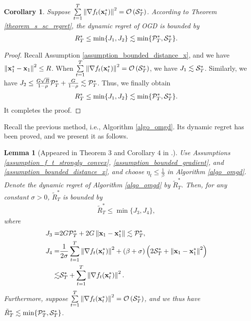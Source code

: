 \documentclass[journal]{IEEEtran}
\newtheorem{Lemma}{\bf{Lemma}}
\newtheorem{Corollary}{\bf{Corollary}}
\begin{document}
\begin{Corollary}
Suppose $\sum\limits_{t=1}^{T} \left\lVert\nabla f_t({\bf x}_t^{\ast})\right\rVert^2 = {\mathcal{O}} \left( {\mathcal{S}}_T^{\ast} \right) $. According to Theorem \ref{theorem_s_sc_regret}, the dynamic regret of OGD is bounded by 
\begin{align}
\nonumber
R_T^{\ast} \le \min \{J_1, J_2\} \lesssim \min \{{\mathcal{P}}_T^{\ast}, {\mathcal{S}}_T^{\ast} \}.
\end{align}

\end{Corollary} 
\begin{proof}
Recall Assumption \ref{assumption_bounded_distance_x}, and we have $\left\lVert{\bf x}_1^{\ast} - {\bf x}_1\right\rVert^2  \le R$. When $\sum\limits_{t=1}^{T} \left\lVert\nabla f_t({\bf x}_t^{\ast})\right\rVert^2 = {\mathcal{O}} \left( {\mathcal{S}}_T^{\ast} \right) $, we have $J_1 \lesssim {\mathcal{S}}_T^{\ast}$. Similarly, we have $J_2\le \frac{G\sqrt{R}}{1-\rho} {\mathcal{P}}_T^{\ast} + \frac{G}{1-\rho} \lesssim {\mathcal{P}}_T^{\ast}$. Thus, we finally obtain
\begin{align}
\nonumber
R_T^{\ast} \le \min \{J_1, J_2\} \lesssim \min\{{\mathcal{P}}_T^{\ast}, {\mathcal{S}}_T^{\ast} \}.
\end{align} It completes the proof.

\end{proof}





Recall the previous method, i.e., Algorithm \ref{algo_omgd}. Its dynamic regret has been proved, and we present it as follows.
\begin{Lemma}[Appeared in Theorem $3$ and Corollary $4$ in \cite{Zhang:2016wl}.]
\label{lemma_previous_result_sc_regret}
Use Assumptions \ref{assumption_f_t_strongly_convex}, \ref{assumption_bounded_gradient}, and \ref{assumption_bounded_distance_x}, and choose $\eta_t \le \frac{1}{\beta}$ in Algorithm \ref{algo_omgd}. Denote the dynamic regret of Algorithm \ref{algo_omgd} by $\tilde{R}_T^{\ast}$. Then, for any constant $\sigma>0$, $\tilde{R}_T^{\ast}$ is bounded by 
\begin{align}
\nonumber
\tilde{R}_T^{\ast} \le \min\{J_3, J_4\},
\end{align} where 
\begin{align}
\nonumber
J_3 = & 2G {\mathcal{P}}_T^{\ast} + 2G \left\lVert{\bf x}_1 - {\bf x}_1^\ast\right\rVert \lesssim {\mathcal{P}}_T^{\ast}, \\ \nonumber
J_4 = & \frac{1}{2\sigma} \sum_{t=1}^T \left\lVert\nabla f_t({\bf x}_t^\ast)\right\rVert^2 +(\beta + \sigma) \left(  2{\mathcal{S}}_T^{\ast}  +  \left\lVert{\bf x}_1 - {\bf x}_1^\ast\right\rVert^2  \right) \\ \nonumber
\lesssim & {\mathcal{S}}_T^{\ast} + \sum_{t=1}^T \left\lVert\nabla f_t({\bf x}_t^\ast)\right\rVert^2.
\end{align} Furthermore, suppose $\sum\limits_{t=1}^{T} \left\lVert\nabla f_t({\bf x}_t^{\ast})\right\rVert^2 = {\mathcal{O}} \left( {\mathcal{S}}_T^{\ast} \right) $, and we thus have $\tilde{R}_T^{\ast} \lesssim  \min \{ {\mathcal{P}}_T^{\ast}, {\mathcal{S}}_T^{\ast} \}$.
\end{Lemma}
\end{document}
